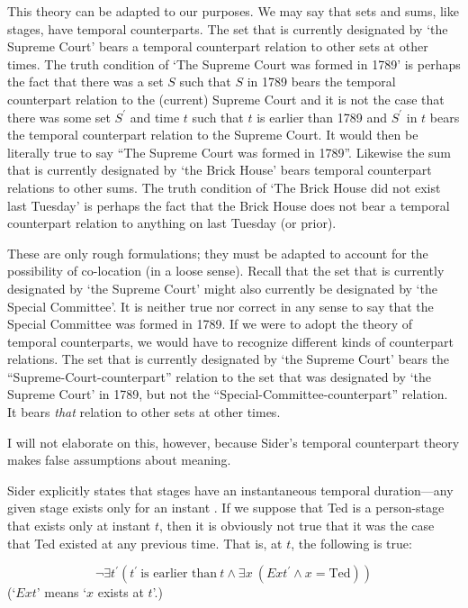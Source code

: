 \documentclass[11pt]{article}
\begin{document}
\begin{spacing}{1.5}
This theory can be adapted to our purposes.  We may say that sets and
sums, like stages, have temporal counterparts.  The set that is
currently designated by `the Supreme Court' bears a temporal
counterpart relation to other sets at other times.  The truth
condition of `The Supreme Court was formed in 1789' is perhaps the
fact that there was a set $S$ such that $S$ in 1789 bears the temporal
counterpart relation to the (current) Supreme Court and it is not the
case that there was some set $S^{\prime}$ and time $t$ such that $t$
is earlier than 1789 and $S^{\prime}$ in $t$ bears the temporal
counterpart relation to the Supreme Court.  It would then be literally
true to say ``The Supreme Court was formed in 1789''.  Likewise the
sum that is currently designated by `the Brick House' bears temporal
counterpart relations to other sums.  The truth condition of `The
Brick House did not exist last Tuesday' is perhaps the fact that the
Brick House does not bear a temporal counterpart relation to anything
on last Tuesday (or prior).

These are only rough formulations; they must be adapted to account for
the possibility of co-location (in a loose sense).  Recall that the
set that is currently designated by `the Supreme Court' might also
currently be designated by `the Special Committee'.  It is neither
true nor correct in any sense to say that the Special Committee was
formed in 1789.  If we were to adopt the theory of temporal
counterparts, we would have to recognize different kinds of
counterpart relations.  The set that is currently designated by `the
Supreme Court' bears the ``Supreme-Court-counterpart'' relation to the
set that was designated by `the Supreme Court' in 1789, but not the
``Special-Committee-counterpart'' relation.  It bears {\em that}
relation to other sets at other times.

I will not elaborate on this, however, because Sider's temporal
counterpart theory makes false assumptions about meaning.

Sider explicitly states that stages have an instantaneous temporal
duration---any given stage exists only for an instant
\citeyearpar[xiv]{sider2001}.  If we suppose that Ted is a
person-stage that exists only at instant $t$, then it is obviously not
true that it was the case that Ted existed at any previous time.  That
is, at $t$, the following is true:

\begin{displaymath}
\neg \exists t^{\prime} (t^{\prime}\ \text{is earlier than}\ t \wedge
\exists x\ (Ext^{\prime} \wedge x = \text{Ted}))
\end{displaymath}
(`$Ext$' means `$x$ exists at $t$'.)


\end{spacing}
\end{document}
